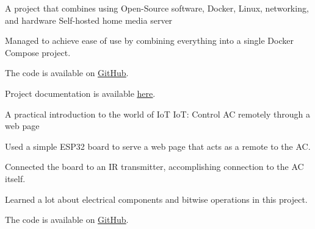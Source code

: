 

\begin{cventries}

  \cventry
    {A project that combines using Open-Source software, Docker, Linux, networking, and hardware} %
    {Self-hosted home media server} %
    {} %
    {} %
    {
      \begin{cvitems} %
        \item {Managed to achieve ease of use by combining everything into a single Docker Compose project.}
        \item {The code is available on \underline{\href{https://github.com/ordabool/MediaServer}{GitHub}}.}
        \item {Project documentation is available \underline{\href{https://docs.jellybeb.com/pages/general/overview.html}{here}}.}
      \end{cvitems}
    }

  \cventry
    {A practical introduction to the world of IoT} %
    {IoT: Control AC remotely through a web page} %
    {} %
    {} %
    {
      \begin{cvitems} %
        \item {Used a simple ESP32 board to serve a web page that acts as a remote to the AC.}
        \item {Connected the board to an IR transmitter, accomplishing connection to the AC itself.}
        \item {Learned a lot about electrical components and bitwise operations in this project.}
        \item {The code is available on \underline{\href{https://github.com/ordabool/ac_remote_esp32}{GitHub}}.}
      \end{cvitems}
    }


\end{cventries}
